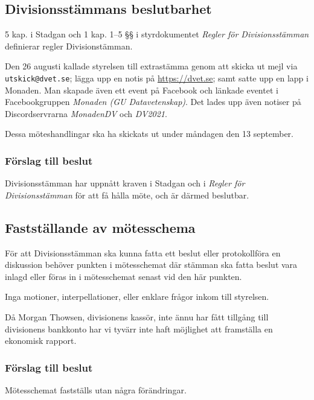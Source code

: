 \documentclass[protokoll]{dvd}
\begin{document}
\subsection{Divisionsstämmans beslutbarhet}

5 kap. i Stadgan och 1 kap. 1--5 §§ i styrdokumentet \emph{Regler för Divisionsstämman} definierar regler Divisionstämman.

Den 26 augusti kallade styrelsen till extrastämma genom att skicka ut mejl via \verb|utskick@dvet.se|; lägga upp en notis på \url{https://dvet.se}; samt satte upp en lapp i Monaden.
Man skapade även ett event på Facebook och länkade eventet i Facebookgruppen \emph{Monaden (GU Datavetenskap)}.
Det lades upp även notiser på Discordservrarna \emph{MonadenDV} och \emph{DV2021}.

Dessa möteshandlingar ska ha skickats ut under måndagen den 13 september.

\subsubsection*{Förslag till beslut}

\begin{attsatser}
	\item Divisionsstämman har uppnått kraven i Stadgan och i \emph{Regler för Divisionsstämman} för att få hålla möte, och är därmed beslutbar.
\end{attsatser}

\subsection{Fastställande av mötesschema}

För att Divisionsstämman ska kunna fatta ett beslut eller protokollföra en diskussion behöver punkten i mötesschemat där stämman ska fatta beslut vara inlagd eller föras in i mötesschemat senast vid den här punkten.

Inga motioner, interpellationer, eller enklare frågor inkom till styrelsen.

Då Morgan Thowsen, divisionens kassör, inte ännu har fått tillgång till divisionens bankkonto har vi tyvärr inte haft möjlighet att framställa en ekonomisk rapport.

\subsubsection*{Förslag till beslut}

\begin{attsatser}
	\item Mötesschemat fastställs utan några förändringar.
\end{attsatser}
\end{document}
